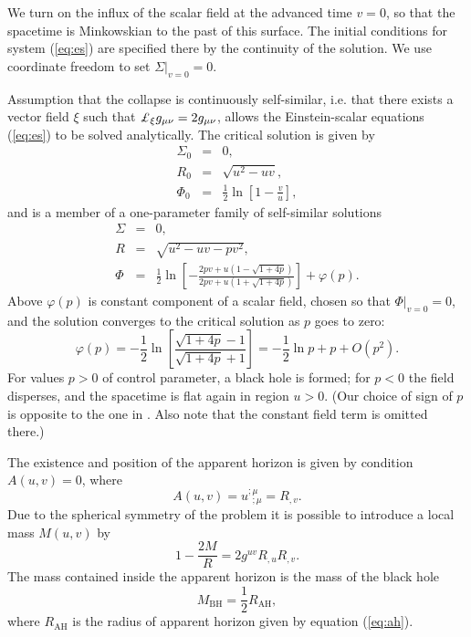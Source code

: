 We turn on the influx of the scalar field at the advanced time $v=0$,
so that the spacetime is Minkowskian to the past of this surface. The
initial conditions for system (\ref{eq:es}) are specified there by the
continuity of the solution. We use coordinate freedom to set
$\Sigma|_{v=0}=0$.

Assumption that the collapse is continuously self-similar, i.e. that
there exists a vector field $\xi$ such that $\Lie_\xi g_{\mu\nu} =
2g_{\mu\nu}$, allows the Einstein-scalar equations (\ref{eq:es}) to be
solved analytically. The critical solution is given by
\begin{eqnarray} \label{eq:crit}
  \Sigma_0 &=& 0,\nonumber\\
  R_0 &=& \sqrt{u^2 - uv},\nonumber\\
  \Phi_0 &=& \frac{1}{2} \ln \left[1 - \frac{v}{u}\right],
\end{eqnarray}
and is a member of a one-parameter family of self-similar solutions
\begin{eqnarray} \label{eq:ss_soln}
  \Sigma &=& 0,\nonumber\\
  R &=& \sqrt{u^2 - uv - pv^2},\nonumber\\
  \Phi &=& \frac{1}{2} \ln
    \left[-\frac{2pv + u(1 - \sqrt{1+4p})}{2pv + u(1 + \sqrt{1+4p})}\right] +
    \varphi(p).
\end{eqnarray}
Above $\varphi(p)$ is constant component of a scalar field, chosen so
that $\Phi|_{v=0}=0$, and the solution converges to the critical
solution as $p$ goes to zero:
\begin{equation} \label{eq:const_phi}
  \varphi(p) =
    - \frac{1}{2} \ln \left[\frac{\sqrt{1+4p}-1}{\sqrt{1+4p}+1}\right] =
    - \frac{1}{2} \ln p + p + O(p^2).
\end{equation}
For values $p>0$ of control parameter, a black hole is formed; for
$p<0$ the field disperses, and the spacetime is flat again in region
$u>0$. (Our choice of sign of $p$ is opposite to the one in
\cite{Brady:94}. Also note that the constant field term is omitted
there.)

The existence and position of the apparent horizon is given by
condition $A(u,v)=0$, where
\begin{equation} \label{eq:ah}
  A(u,v) = u^{;\mu}_{\ \ ;\mu} = R_{,v}.
\end{equation}
Due to the spherical symmetry of the problem it is possible to
introduce a local mass $M(u,v)$ by
\begin{equation} \label{eq:mass}
  1 - \frac{2M}{R} = 2 g^{uv} R_{,u}R_{,v}.
\end{equation}
The mass contained inside the apparent horizon is the mass of the black
hole
\begin{equation} \label{eq:m_bh}
  M_{\text{BH}} = \frac{1}{2} R_{\text{AH}},
\end{equation}
where $R_{\text{AH}}$ is the radius of apparent horizon given by
equation (\ref{eq:ah}).


